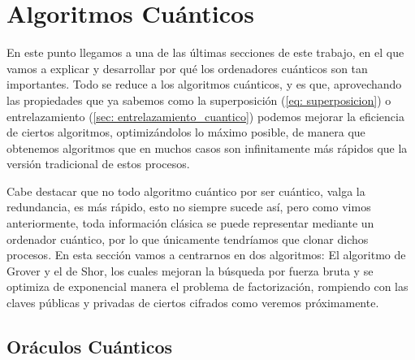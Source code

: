 \documentclass[12pt]{article}
\numberwithin{equation}{section} %
\begin{document}
    \vspace{10mm}










    \newpage
    \thispagestyle{empty}
    \mbox{}

    \section{Algoritmos Cuánticos}\label{sec: algoritmos_cuanticos}

    \vspace{5mm}

    En este punto llegamos a una de las últimas secciones de este trabajo, en el que vamos a explicar y desarrollar por qué los ordenadores cuánticos son tan importantes. Todo se reduce a los algoritmos cuánticos, y es que, aprovechando las propiedades que ya sabemos como la superposición (\ref{eq: superposicion}) o entrelazamiento (\ref{sec: entrelazamiento_cuantico}) podemos mejorar la eficiencia de ciertos algoritmos, optimizándolos lo máximo posible, de manera que obtenemos algoritmos que en muchos casos son infinitamente más rápidos que la versión tradicional de estos procesos.

    \vspace{5mm}

    Cabe destacar que no todo algoritmo cuántico por ser cuántico, valga la redundancia, es más rápido, esto no siempre sucede así, pero como vimos anteriormente, toda información clásica se puede representar mediante un ordenador cuántico, por lo que únicamente tendríamos que clonar dichos procesos. En esta sección vamos a centrarnos en dos algoritmos: El algoritmo de Grover y el de Shor, los cuales mejoran la búsqueda por fuerza bruta y se optimiza de exponencial manera el problema de factorización, rompiendo con las claves públicas y privadas de ciertos cifrados como veremos próximamente.

    \vspace{5mm}





    \subsection{Oráculos Cuánticos}

    \vspace{5mm}
\end{document}
